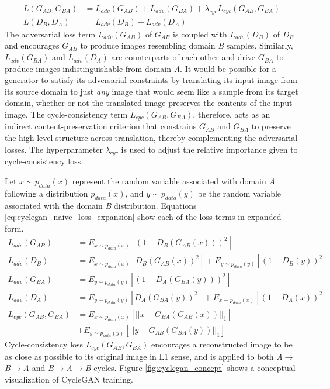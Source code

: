 \begin{equation}
    \begin{aligned}
    L(G_{AB}, G_{BA}) &= L_{adv}(G_{AB}) + L_{adv}(G_{BA}) + \lambda_{cyc} L_{cyc}(G_{AB}, G_{BA}) \\[1mm]
    L(D_B, D_A) &= L_{adv}(D_B) + L_{adv}(D_A)
    \end{aligned}
    \label{eq:cyclegan_naive_loss_components}
\end{equation}
The adversarial loss term $L_{adv}(G_{AB})$ of $G_{AB}$ is coupled with $L_{adv}(D_B)$ of $D_B$ and encourages $G_{AB}$ to produce images resembling domain \textit{B} samples. Similarly, $L_{adv}(G_{BA})$ and $L_{adv}(D_A)$ are counterparts of each other and drive $G_{BA}$ to produce images indistinguishable from domain \textit{A}. It would be possible for a generator to satisfy its adversarial constraints by translating its input image from its source domain to just \textit{any} image that would seem like a sample from its target domain, whether or not the translated image preserves the contents of the input image. The cycle-consistency term $L_{cyc}(G_{AB}, G_{BA})$, therefore, acts as an indirect content-preservation criterion that constrains $G_{AB}$ and $G_{BA}$ to preserve the high-level structure across translation, thereby complementing the adversarial losses. The hyperparameter $\lambda_{cyc}$ is used to adjust the relative importance given to cycle-consistency loss. 

Let $x \sim p_{data}(x)$ represent the random variable associated with domain \textit{A} following a distribution $p_{data}(x)$, and $y \sim p_{data}(y)$ be the random variable associated with the domain \textit{B} distribution. Equations \ref{eq:cyclegan_naive_loss_expansion} show each of the loss terms in expanded form.
\begin{equation}
    \begin{aligned}
    L_{adv}(G_{AB}) &= E_{x \sim p_{data}(x)} [(1 - D_B(G_{AB}(x)))^2]  \\[1mm]
    L_{adv}(D_B) &= E_{x \sim p_{data}(x)} [D_B(G_{AB}(x))^2] + E_{y \sim p_{data}(y)} [(1 - D_B(y))^2] \\[4mm]
    L_{adv}(G_{BA}) &= E_{y \sim p_{data}(y)} [(1 - D_A(G_{BA}(y)))^2]  \\[1mm]
    L_{adv}(D_A) &= E_{y \sim p_{data}(y)} [D_A(G_{BA}(y))^2] + E_{x \sim p_{data}(x)} [(1 - D_A(x))^2] \\[4mm]
    L_{cyc}(G_{AB}, G_{BA}) &= E_{x \sim p_{data}(x)} [|| x - G_{BA}(G_{AB}(x)) ||_1]  \\
                            &+ E_{y \sim p_{data}(y)} [|| y - G_{AB}(G_{BA}(y)) ||_1] 
    \end{aligned}
    \label{eq:cyclegan_naive_loss_expansion}
\end{equation}
Cycle-consistency loss $L_{cyc}(G_{AB}, G_{BA})$ encourages a reconstructed image to be as close as possible to its original image in L1 sense, and is applied to both \textit{A}$\rightarrow$\textit{B}$\rightarrow$\textit{A} and \textit{B}$\rightarrow$\textit{A}$\rightarrow$\textit{B} cycles. Figure \ref{fig:cyclegan_concept} shows a conceptual visualization of CycleGAN training.

